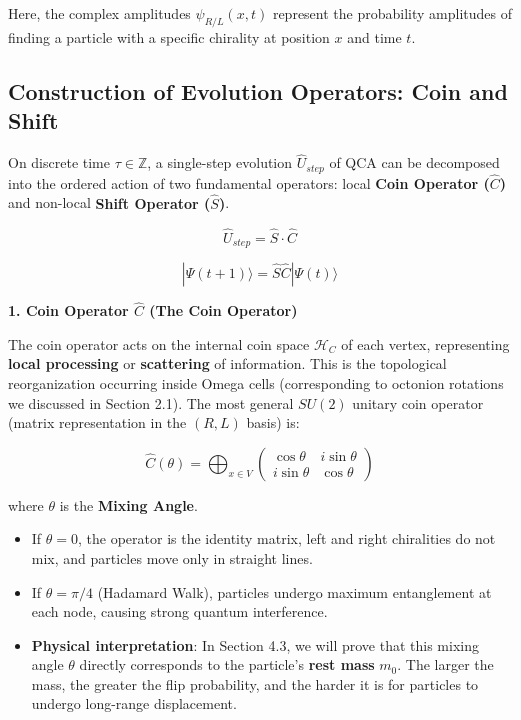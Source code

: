 Here, the complex amplitudes $\psi_{R/L}(x, t)$ represent the probability amplitudes of finding a particle with a specific chirality at position $x$ and time $t$.

\subsection{Construction of Evolution Operators: Coin and Shift}

On discrete time $\tau \in \mathbb{Z}$, a single-step evolution $\hat{U}_{step}$ of QCA can be decomposed into the ordered action of two fundamental operators: local \textbf{Coin Operator ($\hat{C}$)} and non-local \textbf{Shift Operator ($\hat{S}$)}.

\[\hat{U}_{step} = \hat{S} \cdot \hat{C}\]

\[|\Psi(t+1)\rangle = \hat{S} \hat{C} |\Psi(t)\rangle\]

\textbf{1. Coin Operator $\hat{C}$ (The Coin Operator)}

The coin operator acts on the internal coin space $\mathcal{H}_C$ of each vertex, representing \textbf{local processing} or \textbf{scattering} of information. This is the topological reorganization occurring inside Omega cells (corresponding to octonion rotations we discussed in Section 2.1).
The most general $SU(2)$ unitary coin operator (matrix representation in the $(R, L)$ basis) is:

\[\hat{C}(\theta) = \bigoplus_{x \in V} \begin{pmatrix} \cos \theta & i \sin \theta \\ i \sin \theta & \cos \theta \end{pmatrix}\]

where $\theta$ is the \textbf{Mixing Angle}.

\begin{itemize}
\item If $\theta = 0$, the operator is the identity matrix, left and right chiralities do not mix, and particles move only in straight lines.
\item If $\theta = \pi/4$ (Hadamard Walk), particles undergo maximum entanglement at each node, causing strong quantum interference.
\item \textbf{Physical interpretation}: In Section 4.3, we will prove that this mixing angle $\theta$ directly corresponds to the particle's \textbf{rest mass} $m_0$. The larger the mass, the greater the flip probability, and the harder it is for particles to undergo long-range displacement.
\end{itemize}

